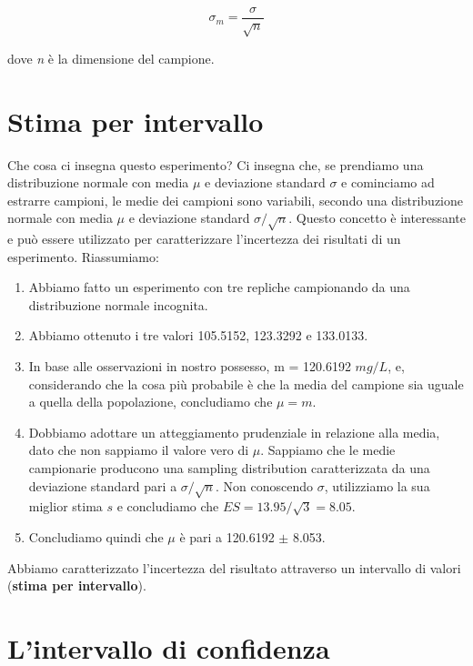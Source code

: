 \documentclass[a4paper,12pt,oneside]{book}
\providecommand{\tightlist}{%
  \setlength{\itemsep}{0pt}\setlength{\parskip}{0pt}}
\begin{document}
\[\sigma_m  = \frac{\sigma }{\sqrt n }\]

dove \emph{n} è la dimensione del campione.

\hypertarget{stima-per-intervallo}{%
\section{Stima per intervallo}\label{stima-per-intervallo}}

Che cosa ci insegna questo esperimento? Ci insegna che, se prendiamo una distribuzione normale con media \(\mu\) e deviazione standard \(\sigma\) e cominciamo ad estrarre campioni, le medie dei campioni sono variabili, secondo una distribuzione normale con media \(\mu\) e deviazione standard \(\sigma / \sqrt{n}\). Questo concetto è interessante e può essere utilizzato per caratterizzare l'incertezza dei risultati di un esperimento. Riassumiamo:

\begin{enumerate}
\def\labelenumi{\arabic{enumi}.}
\tightlist
\item
  Abbiamo fatto un esperimento con tre repliche campionando da una distribuzione normale incognita.
\item
  Abbiamo ottenuto i tre valori 105.5152, 123.3292 e 133.0133.
\item
  In base alle osservazioni in nostro possesso, m = 120.6192 \(mg/L\), e, considerando che la cosa più probabile è che la media del campione sia uguale a quella della popolazione, concludiamo che \(\mu = m\).
\item
  Dobbiamo adottare un atteggiamento prudenziale in relazione alla media, dato che non sappiamo il valore vero di \(\mu\). Sappiamo che le medie campionarie producono una sampling distribution caratterizzata da una deviazione standard pari a \(\sigma / \sqrt{n}\). Non conoscendo \(\sigma\), utilizziamo la sua miglior stima \(s\) e concludiamo che \(ES = 13.95/\sqrt{3} = 8.05\).
\item
  Concludiamo quindi che \(\mu\) è pari a 120.6192 \(\pm\) 8.053.
\end{enumerate}

Abbiamo caratterizzato l'incertezza del risultato attraverso un intervallo di valori (\textbf{stima per intervallo}).

\hypertarget{lintervallo-di-confidenza}{%
\section{L'intervallo di confidenza}\label{lintervallo-di-confidenza}}
\end{document}
